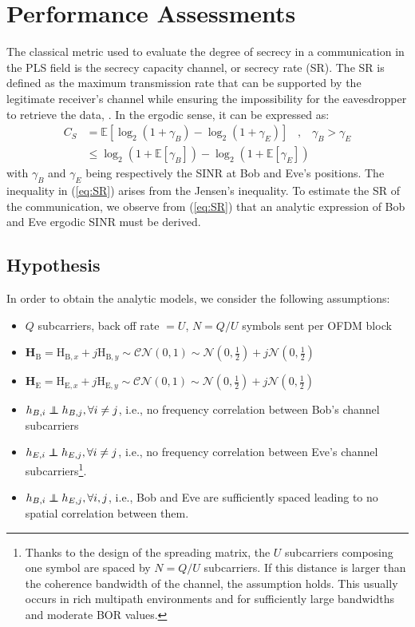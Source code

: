 \documentclass[journal,comsoc]{IEEEtran}
\newcommand{\EX}[1]{\mathbb{E} \left[#1\right]}%
\newcommand{\HE}{\textbf{H}_{\text{E}}}
\newcommand{\HB}{\textbf{H}_{\text{B}}}
\newcommand{\mat}[1]{\boldsymbol{\mathrm{#1}}}
\newcommand\independent{\protect\mathpalette{\protect\independenT}{\perp}}
\def\independenT#1#2{\mathrel{\rlap{$#1#2$}\mkern2mu{#1#2}}}
\begin{document}
\section{Performance Assessments}
\label{sec:perf}
The classical metric used to evaluate the degree of secrecy in a communication in the PLS field is the secrecy capacity channel, or secrecy rate (SR). The SR is defined as the maximum transmission rate that can be supported by the legitimate receiver's channel while ensuring the impossibility for the eavesdropper to retrieve the data, \cite{7348007}. In the ergodic sense, it can be expressed as:
\begin{equation}
\begin{split}
C_S &=  \EX{\log_2{\left(1+\gamma_B\right)} - \log_2{\left(1+\gamma_E\right)}} \; \; \; , \; \; \;  \gamma_B > \gamma_E \\
&\leq   \log_2 \left( 1+ \EX{\gamma_B} \right) - \log_2 \left( 1+ \EX{\gamma_E}\right) 
\end{split}
\label{eq:SR}
\end{equation}
with $\gamma_B$ and $\gamma_E$ being respectively the SINR at Bob and Eve's positions. The inequality in (\ref{eq:SR}) arises from the Jensen's inequality. To estimate the SR of the communication, we observe from (\ref{eq:SR}) that an analytic expression of Bob and Eve ergodic SINR must be derived.




\subsection{Hypothesis}
In order to obtain the analytic models, we consider the following assumptions:
\begin{itemize}
	\item $Q$ subcarriers, back off rate $= U$, $N = Q/U$ symbols sent per OFDM block
	\item  $\HB = \mat{H}_{\text{B},x} + j\mat{H}_{\text{B},y} \sim \mathcal{CN}(0,1) \sim \mathcal{N}(0,\frac{1}{2}) + j \mathcal{N}(0,\frac{1}{2}) $
	\item  $\HE = \mat{H}_{\text{E},x} + j\mat{H}_{\text{E},y} \sim \mathcal{CN}(0,1) \sim \mathcal{N}(0,\frac{1}{2}) + j \mathcal{N}(0,\frac{1}{2}) $
	\item $h_{B,i} \independent h_{B,j}, \forall i \neq j$, i.e., no frequency correlation between Bob's channel subcarriers
	\item $h_{E,i} \independent h_{E,j}, \forall i \neq j$, i.e., no frequency correlation between Eve's channel subcarriers\footnote{Thanks to the design of the spreading matrix, the $U$ subcarriers composing one symbol are spaced by $N = Q/U$ subcarriers. If this distance is larger than the coherence bandwidth of the channel, the assumption holds. This usually occurs in rich multipath environments and for sufficiently large bandwidths and moderate BOR values.}.
	\item $h_{B,i} \independent h_{E,j}, \forall i,j$, i.e., Bob and Eve are sufficiently spaced leading to no spatial correlation between them.
\end{itemize}
\end{document}
